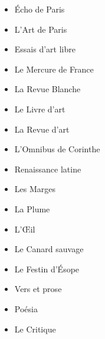 \begin{multicols}{2}\raggedright
\begin{itemize}
  \item Écho de Paris
  \item L’Art de Paris
  \item Essais d’art libre
  \item Le Mercure de France
  \item La Revue Blanche
  \item Le Livre d’art
  \item La Revue d’art
  \item L’Omnibus de Corinthe
  \item Renaissance latine
  \item Les Marges
  \item La Plume
  \item L'Œil
  \item Le Canard sauvage
  \item Le Festin d'Ésope
  \item Vers et prose
  \item Poésia
  \item Le Critique
\end{itemize}
\end{multicols}